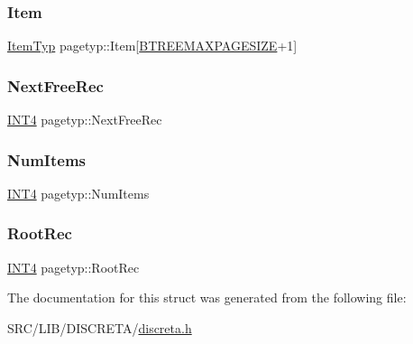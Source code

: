 \mbox{\label{structpagetyp_ae929989fcece6e6021162d990866d434}} 
\subsubsection{\texorpdfstring{Item}{Item}}
{\footnotesize\ttfamily \mbox{\hyperlink{discreta_8h_a2fdd526928017b3784ac2ea203f31011}{Item\+Typ}} pagetyp\+::\+Item\mbox{[}\mbox{\hyperlink{discreta_8h_abe72dc49bd2230ce2515b8ef6e5ccf35}{B\+T\+R\+E\+E\+M\+A\+X\+P\+A\+G\+E\+S\+I\+ZE}}+1\mbox{]}}

\mbox{\label{structpagetyp_a63cc59ac2ae5822d9df2a473e14aaf21}} 
\subsubsection{\texorpdfstring{Next\+Free\+Rec}{NextFreeRec}}
{\footnotesize\ttfamily \mbox{\hyperlink{galois_8h_a6675ac57b948be915e03c09228b57b05}{I\+N\+T4}} pagetyp\+::\+Next\+Free\+Rec}

\mbox{\label{structpagetyp_aba1e45033f320d2ca4a93cd19ae1bdb9}} 
\subsubsection{\texorpdfstring{Num\+Items}{NumItems}}
{\footnotesize\ttfamily \mbox{\hyperlink{galois_8h_a6675ac57b948be915e03c09228b57b05}{I\+N\+T4}} pagetyp\+::\+Num\+Items}

\mbox{\label{structpagetyp_a0e1b5cdf8897b819b2ca3f4a46bdfce2}} 
\subsubsection{\texorpdfstring{Root\+Rec}{RootRec}}
{\footnotesize\ttfamily \mbox{\hyperlink{galois_8h_a6675ac57b948be915e03c09228b57b05}{I\+N\+T4}} pagetyp\+::\+Root\+Rec}



The documentation for this struct was generated from the following file\+:\begin{DoxyCompactItemize}
\item 
S\+R\+C/\+L\+I\+B/\+D\+I\+S\+C\+R\+E\+T\+A/\mbox{\hyperlink{discreta_8h}{discreta.\+h}}\end{DoxyCompactItemize}

